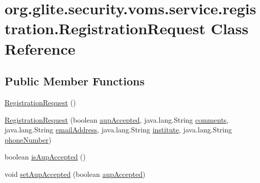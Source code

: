 \hypertarget{classorg_1_1glite_1_1security_1_1voms_1_1service_1_1registration_1_1RegistrationRequest}{
\section{org.glite.security.voms.service.registration.RegistrationRequest Class Reference}
\label{classorg_1_1glite_1_1security_1_1voms_1_1service_1_1registration_1_1RegistrationRequest}
}
\subsection*{Public Member Functions}
\begin{DoxyCompactItemize}
\item 
\hyperlink{classorg_1_1glite_1_1security_1_1voms_1_1service_1_1registration_1_1RegistrationRequest_ad1ae0fe437e84f09fa214721913dfb80}{RegistrationRequest} ()
\item 
\hyperlink{classorg_1_1glite_1_1security_1_1voms_1_1service_1_1registration_1_1RegistrationRequest_a45184e8161cfcf5cb06fa4e0c6a3ebce}{RegistrationRequest} (boolean \hyperlink{classorg_1_1glite_1_1security_1_1voms_1_1service_1_1registration_1_1RegistrationRequest_aa17781ebf05d8a324058b9c77b6f13db}{aupAccepted}, java.lang.String \hyperlink{classorg_1_1glite_1_1security_1_1voms_1_1service_1_1registration_1_1RegistrationRequest_adcb05eaf70616f61ffb34f4813c53ed1}{comments}, java.lang.String \hyperlink{classorg_1_1glite_1_1security_1_1voms_1_1service_1_1registration_1_1RegistrationRequest_a365a6cdc781170ea227509e1cc204f3c}{emailAddress}, java.lang.String \hyperlink{classorg_1_1glite_1_1security_1_1voms_1_1service_1_1registration_1_1RegistrationRequest_a67d3f7cb40f1659a7181aca6cefbdcb9}{institute}, java.lang.String \hyperlink{classorg_1_1glite_1_1security_1_1voms_1_1service_1_1registration_1_1RegistrationRequest_a052a5ee4feedb9e29f23cc324067c0a4}{phoneNumber})
\item 
boolean \hyperlink{classorg_1_1glite_1_1security_1_1voms_1_1service_1_1registration_1_1RegistrationRequest_af9e72e0f27fdac2732286c323848fc95}{isAupAccepted} ()
\item 
void \hyperlink{classorg_1_1glite_1_1security_1_1voms_1_1service_1_1registration_1_1RegistrationRequest_a225795e90fc7e855fa0744736f0c0522}{setAupAccepted} (boolean \hyperlink{classorg_1_1glite_1_1security_1_1voms_1_1service_1_1registration_1_1RegistrationRequest_aa17781ebf05d8a324058b9c77b6f13db}{aupAccepted})

\end{DoxyCompactItemize}
